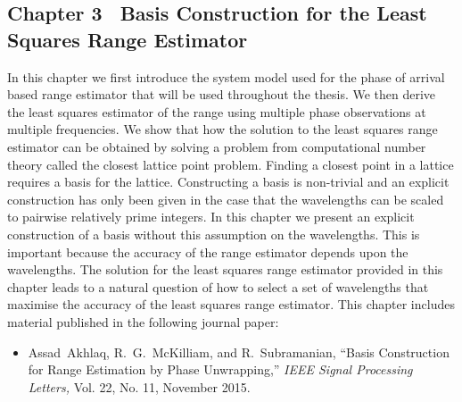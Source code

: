 \subsection*{Chapter 3 \textemdash~Basis Construction for the Least Squares Range Estimator}
In this chapter we first introduce the system model used for the phase of arrival based range estimator that will be used throughout the thesis. We then derive the least squares estimator of the range using multiple phase observations at multiple frequencies. We show that how the solution to the least squares range estimator can be obtained by solving a problem from computational number theory called the closest lattice point problem. Finding a closest point in a lattice requires a basis for the lattice. Constructing a basis is non-trivial and an explicit construction has only been given in the case that the wavelengths can be scaled to pairwise relatively prime integers. In this chapter we present an explicit construction of a basis without this assumption on the wavelengths. This is important because the accuracy of the range estimator depends upon the wavelengths. The solution for the least squares range estimator provided in this chapter leads to a natural question of how to select a set of wavelengths that maximise the accuracy of the least squares range estimator.
\newline
This chapter includes material published in the following journal paper:
\newline
\begin{itemize}
\item{Assad~Akhlaq, R.~G.~McKilliam, and R.~Subramanian, ``{Basis Construction for Range Estimation by Phase Unwrapping},'' \emph{IEEE Signal Processing Letters,}  Vol. 22, No. 11, November 2015.}
\end{itemize}

